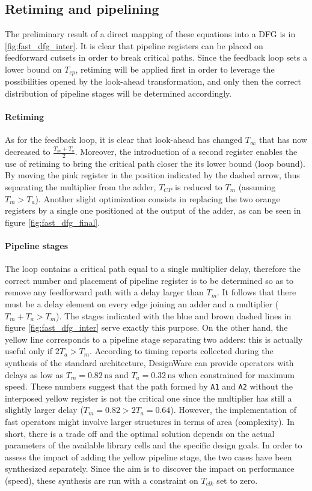 \subsection{Retiming and pipelining}
The preliminary result of a direct mapping of these equations into a DFG is in \autoref{fig:fast_dfg_inter}. It is clear that pipeline registers can be placed on feedforward cutsets in order to break critical paths. Since the feedback loop sets a lower bound on $T_{cp}$, retiming will be applied first in order to leverage the possibilities opened by the look-ahead transformation, and only then the correct distribution of pipeline stages will be determined accordingly.

\paragraph{Retiming} As for the feedback loop, it is clear that look-ahead has changed $T_{\infty}$ that has now decreased to $\frac{T_m+T_a}{2}$. Moreover, the introduction of a second register enables the use of retiming to bring the critical path closer the its lower bound (loop bound). By moving the pink register in the position indicated by the dashed arrow, thus separating the multiplier from the adder, $T_{CP}$ is reduced to $T_m$ (assuming $T_m > T_a$). Another slight optimization consists in replacing the two orange registers by a single one positioned at the output of the adder, as can be seen in figure \autoref{fig:fast_dfg_final}.

\paragraph{Pipeline stages} The loop contains a critical path equal to a single multiplier delay, therefore the correct number and placement of pipeline register is to be determined so as to remove any feedforward path with a delay larger than $T_m$. It follows that there must be a delay element on every edge joining an adder and a multiplier ($T_m + T_a > T_m$). The stages indicated with the blue and brown dashed lines in figure \autoref{fig:fast_dfg_inter} serve exactly this purpose. On the other hand, the yellow line corresponds to a pipeline stage separating two adders: this is actually useful only if $2T_a>T_m$. According to timing reports collected during the synthesis of the standard architecture, DesignWare can provide operators with delays as low as $T_m = 0.82 \,\textrm{ns}$ and $T_a=0.32\,\textrm{ns}$ when constrained for maximum speed. These numbers suggest that the path formed by \texttt{A1} and \texttt{A2} without the interposed yellow register is not the critical one since the multiplier has still a slightly larger delay ($T_m=0.82 > 2T_a =0.64$). However, the implementation of fast operators might involve larger structures in terms of area (complexity). In short, there is a trade off and the optimal solution depends on the actual parameters of the available library cells and the specific design goals. In order to assess the impact of adding the yellow pipeline stage, the two cases have been synthesized separately. Since the aim is to discover the impact on performance (speed), these synthesis are run with a constraint on $T_{clk}$ set to zero.


